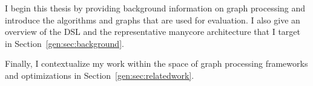 I begin this thesis by providing background information on graph processing and introduce the algorithms and graphs that are used for evaluation.
I also give an overview of the \graphit DSL and the representative manycore architecture that I target in Section~\ref{gen:sec:background}.



Finally, I contextualize my work within the space of graph processing frameworks and optimizations in Section~\ref{gen:sec:relatedwork}.


